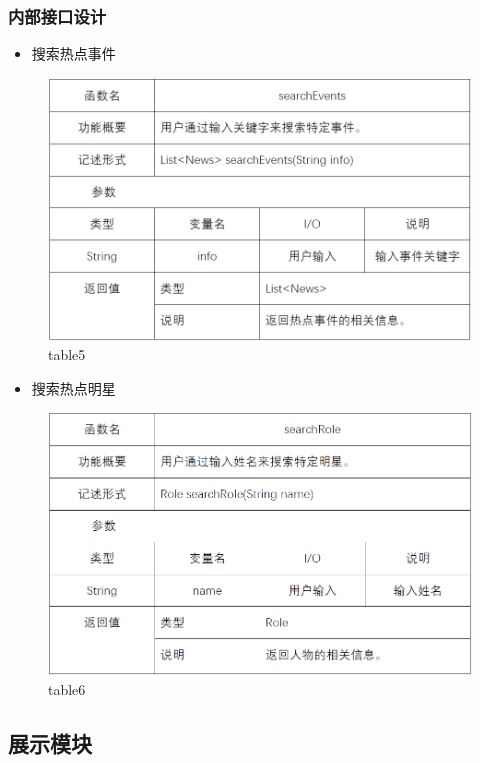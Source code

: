 \subsubsection{内部接口设计}
\begin{itemize} 
	\item 搜索热点事件
\end{itemize}
\begin{figure}[!htbp]
	\centering
	\includegraphics[scale=0.7]{image/b5.png} %
	\caption{table5} %
\end{figure}
\begin{itemize}
	\item 搜索热点明星
\end{itemize}
\begin{figure}[!htbp]
	\centering
	\includegraphics[scale=0.7]{image/b6.png} %
	\caption{table6} %
\end{figure}
\subsection{展示模块}
